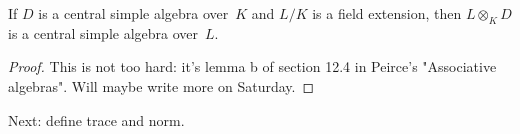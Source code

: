 \begin{lemma}
    \label{IsCentralSimple.baseChange} %
    If $D$ is a central simple algebra over~$K$ and $L/K$ is a field extension, then $L\otimes_KD$ 
    is a central simple algebra over~$L$.
\end{lemma}
\begin{proof}
    This is not too hard: it's lemma b of section 12.4 in Peirce's "Associative algebras".
    Will maybe write more on Saturday.
\end{proof}


Next: define trace and norm.




